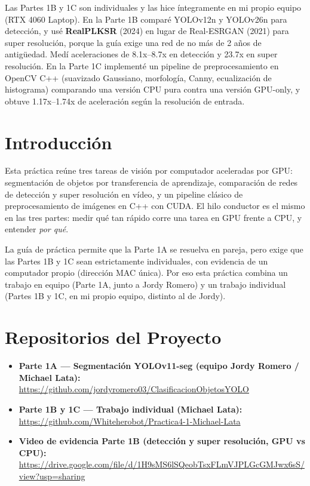 \documentclass[12pt,a4paper]{article}
\begin{document}
Las Partes 1B y 1C son individuales y las hice íntegramente en mi propio equipo (RTX 4060 Laptop). En la Parte 1B comparé YOLOv12n y YOLOv26n para detección, y usé \textbf{RealPLKSR} (2024) en lugar de Real-ESRGAN (2021) para super resolución, porque la guía exige una red de no más de 2 años de antigüedad. Medí aceleraciones de 8.1x--8.7x en detección y 23.7x en super resolución. En la Parte 1C implementé un pipeline de preprocesamiento en OpenCV C++ (suavizado Gaussiano, morfología, Canny, ecualización de histograma) comparando una versión CPU pura contra una versión GPU-only, y obtuve 1.17x--1.74x de aceleración según la resolución de entrada.

\clearpage
\tableofcontents
\clearpage

\section{Introducción}

Esta práctica reúne tres tareas de visión por computador aceleradas por GPU: segmentación de objetos por transferencia de aprendizaje, comparación de redes de detección y super resolución en vídeo, y un pipeline clásico de preprocesamiento de imágenes en C++ con CUDA. El hilo conductor es el mismo en las tres partes: medir qué tan rápido corre una tarea en GPU frente a CPU, y entender \emph{por qué}.

La guía de práctica permite que la Parte 1A se resuelva en pareja, pero exige que las Partes 1B y 1C sean estrictamente individuales, con evidencia de un computador propio (dirección MAC única). Por eso esta práctica combina un trabajo en equipo (Parte 1A, junto a Jordy Romero) y un trabajo individual (Partes 1B y 1C, en mi propio equipo, distinto al de Jordy).

\section*{Repositorios del Proyecto}

\begin{itemize}
  \item \textbf{Parte 1A — Segmentación YOLOv11-seg (equipo Jordy Romero / Michael Lata):}\\
        \url{https://github.com/jordyromero03/ClasificacionObjetosYOLO}

  \item \textbf{Parte 1B y 1C — Trabajo individual (Michael Lata):}\\
        \url{https://github.com/Whiteherobot/Practica4-1-Michael-Lata}

  \item \textbf{Video de evidencia Parte 1B (detección y super resolución, GPU vs CPU):}\\
        \url{https://drive.google.com/file/d/1H9sMS6lSQeobTsxFLmVJPLGcGMJwx6sS/view?usp=sharing}
\end{itemize}
\end{document}
